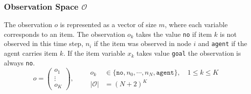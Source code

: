 \subsubsection{Observation Space $\mathcal{O}$}
The observation $o$ is represented as a vector of size $m$, where each variable corresponds to an item. The observation $o_k$ takes the value \texttt{no} if item $k$ is not observed in this time step, $n_i$ if the item was observed in node $i$ and \texttt{agent} if the agent carries item $k$. If the item variable $x_k$ takes value \texttt{goal} the observation is always \texttt{no}.
\begin{equation}
    o = \begin{pmatrix} o_1 \\ \vdots \\ o_K \end{pmatrix}, \qquad \begin{aligned} o_k &\in \{ \texttt{no}, n_0, \cdots, n_N, \texttt{agent} \}, \quad 1 \leq k \leq K\\
    |\mathcal{O}|&= (N+2)^K \end{aligned}
\end{equation}
